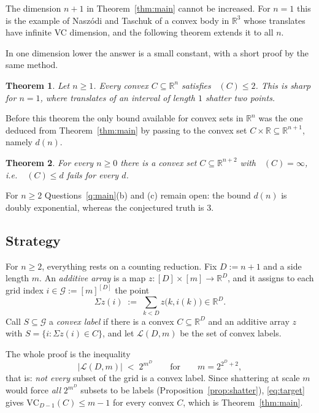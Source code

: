 \documentclass[11pt,a4paper]{article}
\theoremstyle{plain}
\newtheorem{theorem}{Theorem}[section]
\theoremstyle{definition}
\DeclareMathOperator{\VCn}{\mathrm{VC}_n}
\newcommand{\R}{\mathbb{R}}
\newcommand{\Grid}{\mathcal{G}}
\begin{document}
The dimension $n+1$ in Theorem~\ref{thm:main} cannot be increased. For $n=1$ this is the
example of Naszódi and Taschuk \cite[Example~4]{naszoditaschuk} of a convex body in $\R^{3}$
whose translates have infinite VC dimension, and the following theorem extends it to all $n$.

In one dimension lower the answer is a small constant, with a short proof by the same method.

\begin{theorem}\label{thm:below}
Let $n\ge1$. Every convex $C\subseteq\R^{n}$ satisfies $\VCn(C)\le2$. This is sharp for
$n=1$, where translates of an interval of length $1$ shatter two points.
\end{theorem}

Before this theorem the only bound available for convex sets in $\R^n$ was the one deduced from
Theorem~\ref{thm:main} by passing to the convex set $C\times\R\subseteq\R^{n+1}$, namely
$d(n)$.

\begin{theorem}\label{thm:infinite}
For every $n\ge0$ there is a convex set $C\subseteq\R^{n+2}$ with $\VCn(C)=\infty$, i.e.\
$\VCn(C)\le d$ fails for every $d$.
\end{theorem}

For $n\ge2$ Questions~\ref{q:main}(b) and (c) remain open: the bound $d(n)$ is doubly
exponential, whereas the conjectured truth is $3$.

\subsection{Strategy}

For $n\ge2$, everything rests on a counting reduction. Fix $D:=n+1$ and a side length $m$. An
\emph{additive array} is a map $z\colon[D]\times[m]\to\R^D$, and it assigns to each grid
index $i\in\Grid:=[m]^{[D]}$ the point
\[
  \Sigma z(i)\;:=\;\sum_{k<D}z\bigl(k,i(k)\bigr)\in\R^D .
\]
Call $S\subseteq\Grid$ a \emph{convex label} if there is a convex $C\subseteq\R^D$ and an
additive array $z$ with $S=\{i:\Sigma z(i)\in C\}$, and let $\mathcal{L}(D,m)$ be the set
of convex labels.

The whole proof is the inequality
\begin{equation}\label{eq:target}
  \bigl|\mathcal{L}(D,m)\bigr| \;<\; 2^{m^{D}}
  \qquad\text{for}\qquad m=2^{2^{D}+2},
\end{equation}
that is: \emph{not every} subset of the grid is a convex label. Since shattering at scale
$m$ would force \emph{all} $2^{m^D}$ subsets to be labels (Proposition~\ref{prop:shatter}),
\eqref{eq:target} gives $\mathrm{VC}_{D-1}(C)\le m-1$ for every convex $C$, which is
Theorem~\ref{thm:main}.
\end{document}
